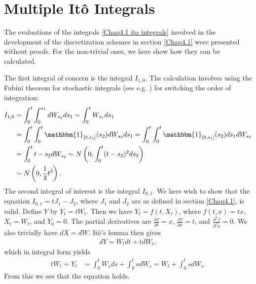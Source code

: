 
\section{Multiple Itô Integrals}
\label{AppendixA}

The evaluations of the integrals \eqref{Chap4.1 ito integrals} involved in the development of the discretization schemes in section \ref{Chap4.1} were presented without proofs.
For the non-trivial ones, we here show how they can be calculated.


The first integral of concern is the integral $I_{1,0}$.
The calculation involves using the Fubini theorem for stochastic integrals (see e.g. \citet[ p.~477]{bjork2009arbitrage}) for switching the order of integration:
\begin{align}\label{App: I1}
I_{1,0}&=\int_0^t \int_0^{s_1}dW_{s_2}ds_1
=\int_0^t W_{s_1}ds_1\notag\\
&=\int_0^t \int_{0}^{t} \mathbbm{1}_{[0,s_1]}(s_2)dW_{s_2}ds_1%
=\int_0^t \int_0^t \mathbbm{1}_{[0,s_1]}(s_2)ds_1dW_{s_2}\notag\\
&=\int_0^t t-s_2dW_{s_2}%
\sim N\left(0,\int_0^t(t-s_2)^2ds_2 \right)\notag\\
&\sim N\left( 0,\frac{1}{3}t^3 \right).
\end{align}
The second integral of interest is the integral $I_{0,1}$.
We here wish to show that the equation $I_{0,1}=tJ_1-J_2$, where $J_1$ and $J_2$ are as defined in section \ref{Chap4.1}, is valid.
Define $Y$ by $Y_t=tW_t$.
Then we have $Y_t = f\left(t,X_t\right)$, where $f(t,x)=tx$, $X_t=W_t$, and $Y_0=0$.
The partial derivatives are $\frac{\partial f}{\partial t}=x$, $\frac{\partial f}{\partial x}=t$, and $\frac{\partial^2 f}{\partial^2 x}=0$.
We also trivially have $dX = dW$.
Itô's lemma then gives
\begin{align}
dY=W_tdt + tdW_t,
\end{align}
which in integral form yields
\begin{align}
tW_t=Y_t&=\int_0^tW_sds + \int_0^t sdW_s=W_t + \int_{0}^{t}sdW_s.
\end{align}
From this we see that the equation holds.

